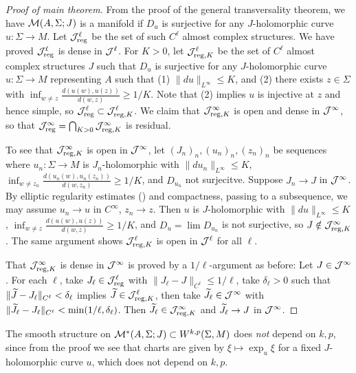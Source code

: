 \begin{proof}[Proof of main theorem]
	From the proof of the general transversality theorem, we have 
	${\mathcal{M}}(A, \Sigma; J)$ is a manifold if $D_u$ is surjective for any 
	$J$-holomorphic curve $u \colon \Sigma \to M$. 
	Let ${\mathcal{J}}_{\mathrm{reg}}^\ell$ be the set of such $C^\ell$ almost complex structures. 
	We have proved ${\mathcal{J}}_{\mathrm{reg}}^\ell$ is dense in ${\mathcal{J}}^\ell$. 
	For $K>0$, let ${\mathcal{J}}_{{\mathrm{reg}}, K}^\ell$ be the set of 
	$C^\ell$ almost complex structures $J$ such that $D_u$ is surjective 
	for any $J$-holomorphic curve $u \colon \Sigma \to M$ 
	representing $A$ such that (1) $\|du\|_{L^\infty} \leq K$, and 
	(2) there exists $z \in \Sigma$ with 
	$\inf_{w \neq z} \frac {d(u(w), u(z))} {d(w, z)} \geq 1 / K$. 
	Note that (2) implies $u$ is injective at $z$ and hence simple, 
	so ${\mathcal{J}}_{\mathrm{reg}}^\ell \subset {\mathcal{J}}_{{\mathrm{reg}}, K}^\ell$. 
	We claim that ${\mathcal{J}}_{{\mathrm{reg}}, K}^\infty$ is open and dense in ${\mathcal{J}}^\infty$, 
	so that ${\mathcal{J}}_{\mathrm{reg}}^\infty = \bigcap_{K > 0} {\mathcal{J}}_{{\mathrm{reg}}, K}^\infty$ is residual.

	To see that ${\mathcal{J}}_{{\mathrm{reg}}, K}^\infty$ is open in ${\mathcal{J}}^\infty$, let 
	$(J_n)_n, (u_n)_n, (z_n)_n$ be sequences where 
	$u_n \colon \Sigma \to M$ is $J_n$-holomorphic with 
	$\|du_n\|_{L^\infty}\leq K$, 
	$\inf_{w \neq z_n} \frac {d(u_n(w), u_n(z_n))} {d(w,z_n)} \geq 1 / K$, 
	and $D_{u_n}$ not surjecitve. 
	Suppose $J_n \to J$ in ${\mathcal{J}}^\infty$. 
	By elliptic regularity estimates (\cite[Theorem B.4.2]{MS}) 
	and compactness, passing to a subsequence, we may assume 
	$u_n \to u$ in $C^\infty$, $z_n \to z$. 
	Then $u$ is $J$-holomorphic with $\|du\|_{L^\infty} \leq K$, 
	$\inf_{w \neq z} \frac {d(u(w), u(z))} {d(w, z)} \geq 1 / K$, and 
	$D_u=\lim D_{u_n}$ is not surjective, so $J \notin {\mathcal{J}}_{{\mathrm{reg}}, K}^\infty$. 
	The same argument shows ${\mathcal{J}}_{{\mathrm{reg}}, K}^\ell$ is open 
	in ${\mathcal{J}}^\ell$ for all $\ell$.

	That ${\mathcal{J}}_{{\mathrm{reg}}, K}^\infty$ is dense in ${\mathcal{J}}^\infty$ 
	is proved by a $1 / \ell$-argument as before: 
	Let $J \in {\mathcal{J}}^\infty$. 
	For each $\ell$, take $J_\ell\in{\mathcal{J}}_{\mathrm{reg}}^\ell$ with 
	$\| J_\ell - J \|_{C^\ell} \leq 1 / \ell$, 
	take $\delta_\ell > 0$ such that $\| \widetilde{J} - J_\ell \|_{C^\ell} < \delta_\ell$ 
	implies $\widetilde{J} \in {\mathcal{J}}_{{\mathrm{reg}}, K}^\ell$, 
	then take $\widetilde{J}_\ell \in {\mathcal{J}}^\infty$ with 
	$\| \widetilde{J}_\ell - J_\ell \|_{C^\ell} < \min (1 / \ell, \delta_\ell)$. 
	Then $\widetilde{J}_\ell \in {\mathcal{J}}_{{\mathrm{reg}}, K}^\infty$ and 
	$\widetilde{J}_\ell \to J$ in ${\mathcal{J}}^\infty$.
\end{proof}

\begin{remark}
	The smooth structure on ${\mathcal{M}}^*(A, \Sigma; J) \subset W^{k, p}(\Sigma, M)$
	does \textit{not} depend on $k, p$, since from the proof we see that 
	charts are given by $\xi \mapsto \exp_u \xi$ for a fixed $J$-holomorphic 
	curve $u$, which does not depend on $k, p$.
\end{remark}